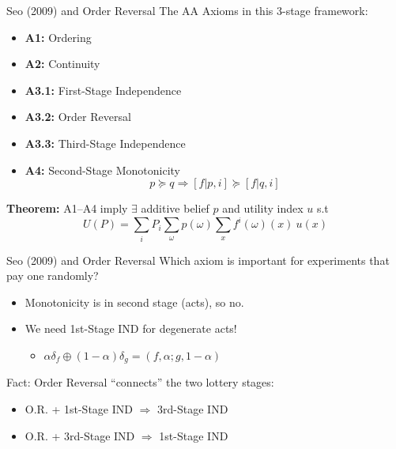\begin{frame}{Seo (2009) and Order Reversal}
The AA Axioms in this 3-stage framework:
\begin{itemize}
    \item \textbf{A1:} Ordering
    \item \textbf{A2:} Continuity
    \item \textbf{A3.1:} First-Stage Independence
    \item \textbf{A3.2:} Order Reversal
    \item \textbf{A3.3:} Third-Stage Independence
    \item \textbf{A4:} Second-Stage Monotonicity
    $$
        p\succeq q \Rightarrow [f|p,i] \succeq [f|q,i]
    $$
\end{itemize}
\textbf{Theorem:} A1--A4 imply $\exists$ additive belief $p$ and utility index $u$ s.t
$$
    U(P) = \sum_i P_i \sum_\omega p(\omega) \sum_x f^i(\omega)(x)\ u(x)
$$
\end{frame}

\begin{frame}{Seo (2009) and Order Reversal}
Which axiom is important for experiments that pay one randomly?\\
\begin{itemize}
    \item Monotonicity is in second stage (acts), so no.
    \item We need 1st-Stage IND for degenerate acts!
    \begin{itemize}
        \item $\alpha \delta_f \oplus (1-\alpha) \delta_g = (f,\alpha;g,1-\alpha)$
    \end{itemize}
\end{itemize}
\br
Fact: Order Reversal ``connects'' the two lottery stages:
\begin{itemize}
    \item O.R. + 1st-Stage IND $\Rightarrow$ 3rd-Stage IND
    \item O.R. + 3rd-Stage IND $\Rightarrow$ 1st-Stage IND
\end{itemize}
    
\end{frame}

